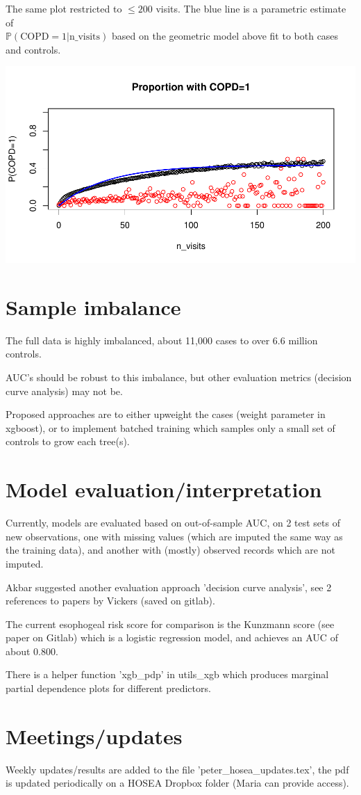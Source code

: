 \documentclass[12pt]{article}
\begin{document}
The same plot restricted to $\leq 200$ visits. The blue line is a parametric estimate of \\ $\mathbb{P}(\text{COPD}=1 | \text{n\_visits})$ based on the geometric model above fit to both cases and controls.

\begin{center}
\includegraphics[width=.6\textwidth]{nvisits_scatterCOPD200.pdf}
\end{center}

\section*{Sample imbalance}

The full data is highly imbalanced, about 11,000 cases to over 6.6 million controls.

AUC's should be robust to this imbalance, but other evaluation metrics (decision curve analysis) may not be.

Proposed approaches are to either upweight the cases (weight parameter in xgboost), or to implement batched training which samples only a small set of controls to grow each tree(s).

\section*{Model evaluation/interpretation}

Currently, models are evaluated based on out-of-sample AUC, on 2 test sets of new observations, one with missing values (which are imputed the same way as the training data), and another with (mostly) observed records which are not imputed.

Akbar suggested another evaluation approach 'decision curve analysis', see 2 references to papers by Vickers (saved on gitlab).

The current esophogeal risk score for comparison is the Kunzmann score (see paper on Gitlab) which is a logistic regression model, and achieves an AUC of about 0.800.

There is a helper function 'xgb\_pdp' in utils\_xgb which produces marginal partial dependence plots for different predictors.

\section*{Meetings/updates}

Weekly updates/results are added to the file 'peter\_hosea\_updates.tex', the pdf is updated periodically on a HOSEA Dropbox folder (Maria can provide access).

%
\end{document}
